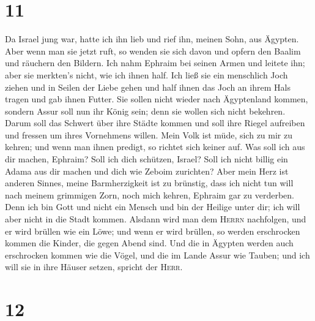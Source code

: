 \hypertarget{section-10}{%
\section{11}\label{section-10}}

 Da Israel jung war, hatte ich ihn lieb und rief ihn,
meinen Sohn, aus Ägypten.  Aber wenn man sie jetzt ruft,
so wenden sie sich davon und opfern den Baalim und räuchern den Bildern.
 Ich nahm Ephraim bei seinen Armen und leitete ihn; aber
sie merkten's nicht, wie ich ihnen half.  Ich ließ sie ein
menschlich Joch ziehen und in Seilen der Liebe gehen und half ihnen das
Joch an ihrem Hals tragen und gab ihnen Futter.  Sie
sollen nicht wieder nach Ägyptenland kommen, sondern Assur soll nun ihr
König sein; denn sie wollen sich nicht bekehren.  Darum
soll das Schwert über ihre Städte kommen und soll ihre Riegel aufreiben
und fressen um ihres Vornehmens willen.  Mein Volk ist
müde, sich zu mir zu kehren; und wenn man ihnen predigt, so richtet sich
keiner auf.  Was soll ich aus dir machen, Ephraim? Soll
ich dich schützen, Israel? Soll ich nicht billig ein Adama aus dir
machen und dich wie Zeboim zurichten? Aber mein Herz ist anderen Sinnes,
meine Barmherzigkeit ist zu brünstig,  dass ich nicht tun
will nach meinem grimmigen Zorn, noch mich kehren, Ephraim gar zu
verderben. Denn ich bin Gott und nicht ein Mensch und bin der Heilige
unter dir; ich will aber nicht in die Stadt kommen. 
Alsdann wird man dem \textsc{Herrn} nachfolgen, und er wird brüllen wie
ein Löwe; und wenn er wird brüllen, so werden erschrocken kommen die
Kinder, die gegen Abend sind.  Und die in Ägypten werden
auch erschrocken kommen wie die Vögel, und die im Lande Assur wie
Tauben; und ich will sie in ihre Häuser setzen, spricht der
\textsc{Herr}.

\hypertarget{section-11}{%
\section{12}\label{section-11}}

